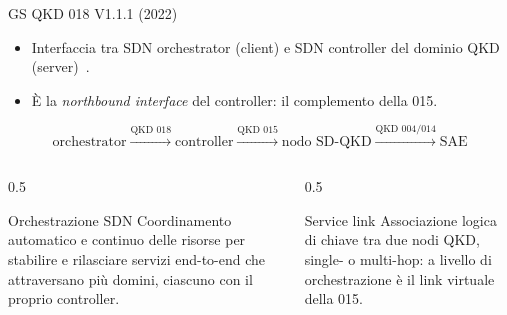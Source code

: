 \documentclass[10pt]{beamer}
\begin{document}
\begin{frame}{GS QKD 018 V1.1.1 (2022)}
  \begin{itemize}
    \item Interfaccia tra \alert{SDN orchestrator} (client) e
          \alert{SDN controller} del dominio QKD (server)~\cite{qkd018}.
    \item È la \emph{northbound interface} del controller: il complemento
          della 015.
  \end{itemize}
  \[
    \text{orchestrator} \xrightarrow{\text{QKD 018}} \text{controller}
    \xrightarrow{\text{QKD 015}} \text{nodo SD-QKD}
    \xrightarrow{\text{QKD 004/014}} \text{SAE}
  \]
  \begin{columns}[T]
    \begin{column}{0.5\textwidth}
      \begin{block}{Orchestrazione SDN}
        \small Coordinamento automatico e continuo delle risorse per
        stabilire e rilasciare servizi end-to-end che attraversano più
        domini, ciascuno con il proprio controller.
      \end{block}
    \end{column}
    \begin{column}{0.5\textwidth}
      \begin{block}{Service link}
        \small Associazione logica di chiave tra due nodi QKD, single- o
        multi-hop: a livello di orchestrazione è il link virtuale della 015.
      \end{block}
    \end{column}
  \end{columns}
\end{frame}
\end{document}

